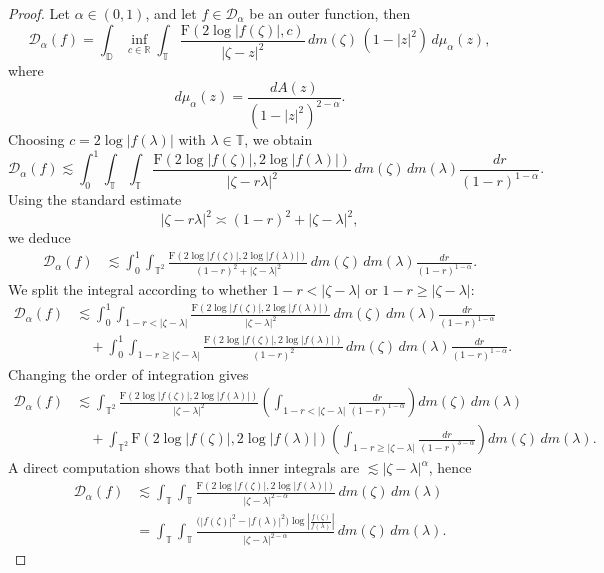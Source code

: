 \documentclass[10pt,a4paper]{amsart}
\newcommand{\FF}{\mathrm{F}}
\newcommand{\cD}{{\mathcal{D}}}
\begin{document}
	\begin{proof}
		Let $\alpha \in (0,1)$, and let $f \in \cD_\alpha$ be an outer function, then
		\[
		\cD_\alpha(f)
		=
		\int_{\mathbb D}
		\inf_{c\in\mathbb R}
		\int_{\mathbb T}
		\frac{\FF(2\log|f(\zeta)|,c)}
		{|\zeta-z|^2}
		\,dm(\zeta)\,
		(1-|z|^2)\,d\mu_\alpha(z),
		\]
		where
		\[
		d\mu_\alpha(z)=\frac{dA(z)}{(1-|z|^2)^{2-\alpha}}.
		\]
		Choosing $c=2\log|f(\lambda)|$ with $\lambda\in\mathbb T$, we obtain
		\[
		\cD_\alpha(f)
		\lesssim
		\int_0^1
		\int_{\mathbb T}
		\int_{\mathbb T}
		\frac{\FF(2\log|f(\zeta)|,2\log|f(\lambda)|)}
		{|\zeta-r\lambda|^2}
		\,dm(\zeta)\,dm(\lambda)
		\frac{dr}{(1-r)^{1-\alpha}}.
		\]
		Using the standard estimate
		\[
		|\zeta-r\lambda|^2 \asymp (1-r)^2+|\zeta-\lambda|^2,
		\]
		we deduce
		\[
		\begin{aligned}
			\cD_\alpha(f)
			&\lesssim
			\int_0^1
			\int_{\mathbb T^2}
			\frac{\FF(2\log|f(\zeta)|,2\log|f(\lambda)|)}
			{(1-r)^2+|\zeta-\lambda|^2}
			\,dm(\zeta)\,dm(\lambda)
			\frac{dr}{(1-r)^{1-\alpha}}.
		\end{aligned}
		\]
		We split the integral according to whether
		$1-r<|\zeta-\lambda|$ or $1-r\ge|\zeta-\lambda|$:
		\[
		\begin{aligned}
			\cD_\alpha(f)
			&\lesssim
			\int_0^1
			\int_{1-r<|\zeta-\lambda|}
			\frac{\FF(2\log|f(\zeta)|,2\log|f(\lambda)|)}
			{|\zeta-\lambda|^2}
			\,dm(\zeta)\,dm(\lambda)
			\frac{dr}{(1-r)^{1-\alpha}}
			\\
			&\quad
			+
			\int_0^1
			\int_{1-r\ge|\zeta-\lambda|}
			\frac{\FF(2\log|f(\zeta)|,2\log|f(\lambda)|)}
			{(1-r)^2}
			\,dm(\zeta)\,dm(\lambda)
			\frac{dr}{(1-r)^{1-\alpha}}.
		\end{aligned}
		\]
		Changing the order of integration gives
		\[
		\begin{aligned}
			\cD_\alpha(f)
			&\lesssim
			\int_{\mathbb T^2}
			\frac{\FF(2\log|f(\zeta)|,2\log|f(\lambda)|)}
			{|\zeta-\lambda|^2}
			\left(
			\int_{1-r<|\zeta-\lambda|}
			\frac{dr}{(1-r)^{1-\alpha}}
			\right)
			dm(\zeta)\,dm(\lambda)
			\\
			&\quad
			+
			\int_{\mathbb T^2}
			\FF(2\log|f(\zeta)|,2\log|f(\lambda)|)
			\left(
			\int_{1-r\ge|\zeta-\lambda|}
			\frac{dr}{(1-r)^{3-\alpha}}
			\right)
			dm(\zeta)\,dm(\lambda).
		\end{aligned}
		\]
		A direct computation shows that both inner integrals are
		$\lesssim |\zeta-\lambda|^\alpha$, hence
		\[\begin{aligned}
			\cD_\alpha(f)&
			\lesssim
			\int_{\mathbb T}
			\int_{\mathbb T}
			\frac{\FF(2\log|f(\zeta)|,2\log|f(\lambda)|)}
			{|\zeta-\lambda|^{2-\alpha}}
			\,dm(\zeta)\,dm(\lambda)\\&=
			\int_{\mathbb T}
			\int_{\mathbb T}
			\frac{\bigl(|f(\zeta)|^2-|f(\lambda)|^2\bigr)
				\log\left|\frac{f(\zeta)}{f(\lambda)}\right|}
			{|\zeta-\lambda|^{2-\alpha}}
			\,dm(\zeta)\,dm(\lambda).
		\end{aligned}
		\]
	\end{proof}
\end{document}
